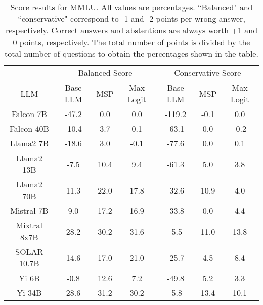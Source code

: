 \begin{table*}
\centering
\begin{tabular}{c|c|c|c|c|c|c}
& \multicolumn{3}{c|}{Balanced Score} & \multicolumn{3}{c}{Conservative Score} \\ 
LLM & Base LLM & MSP & Max Logit & Base LLM & MSP & Max Logit\\ \hline
Falcon 7B & -47.2 & 0.0 & 0.0 & -119.2 & -0.1 & 0.0\\
Falcon 40B & -10.4 & 3.7 & 0.1 & -63.1 & 0.0 & -0.2\\
Llama2 7B & -18.6 & 3.0 & -0.1 & -77.6 & 0.0 & 0.1\\
Llama2 13B & -7.5 & 10.4 & 9.4 & -61.3 & 5.0 & 3.8\\
Llama2 70B & 11.3 & 22.0 & 17.8 & -32.6 & 10.9 & 4.0\\
Mistral 7B & 9.0 & 17.2 & 16.9 & -33.8 & 0.0 & 4.4\\
Mixtral 8x7B & 28.2 & 30.2 & 31.6 & -5.5 & 11.0 & 13.8\\
SOLAR 10.7B & 14.6 & 17.0 & 21.0 & -25.7 & 4.5 & 8.4\\
Yi 6B & -0.8 & 12.6 & 7.2 & -49.8 & 5.2 & 3.3\\
Yi 34B & 28.6 & 31.2 & 30.2 & -5.8 & 13.4 & 10.1\\
\hline
\end{tabular}
\caption{Score results for MMLU. All values are percentages. ``Balanced" and ``conservative" correspond to -1 and -2 points per wrong answer, respectively. Correct answers and abstentions are always worth +1 and 0 points, respectively. The total number of points is divided by the total number of questions to obtain the percentages shown in the table.}
\label{tab:mmlu_score}
\end{table*}
